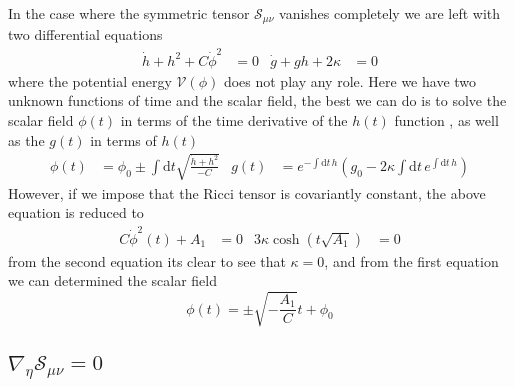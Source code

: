 \documentclass[10pt,a4paper]{article}
\begin{document}
In the case where the symmetric tensor $\mathcal{S}_{\mu\nu}$ vanishes completely we are left with two differential equations
\begin{align}
  \dot{h} + h^2 + C\dot{\phi}^2 & = 0 & \dot{g} + gh + 2\kappa & = 0
\end{align}
where the potential energy $\mathcal{V}(\phi)$ does not play any role. Here we have two unknown functions of time and the scalar field, the best we 
can do is to solve the scalar field $\phi(t)$ in terms of the time derivative of the $h(t)$ function , as well as the $g(t)$ in terms of $h(t)$
\begin{align}
  \phi(t) & = \phi_0 \pm \int \mathrm{d}t \sqrt{\frac{\dot{h} + h^2}{-C}} & 
  g(t) & = e^{- \int \mathrm{d}t \, h} \left( g_0 - 2 \kappa \int \mathrm{d}t \, e^{\int \mathrm{d}t \, h} \right)
\end{align}
However, if we impose that the Ricci tensor is covariantly constant, the above equation is reduced to
\begin{align}
  C\dot{\phi}^2(t) + A_1 & = 0 & 3\kappa \cosh(t\sqrt{A_1}) & = 0
\end{align}
from the second equation its clear to see that $\kappa = 0$, and from the first equation we can determined the scalar field
\begin{equation}
  \phi(t) = \pm\sqrt{-\frac{A_1}{C}}t + \phi_0
\end{equation}


\subsection{$\nabla_{\eta} \mathcal{S}_{\mu\nu} = 0 $}
\end{document}
